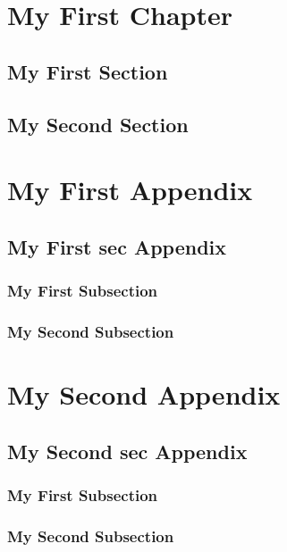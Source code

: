 \documentclass{book}
\begin{document}
\tableofcontents

\chapter{\large My First Chapter}
\localtableofcontents
\section{  My First Section}
\section{My Second Section}

\begin{appendices}
\chapter{My First Appendix}
\section{My First sec Appendix}
\localtableofcontents
\subsection{My First Subsection}
\subsection{My Second Subsection}
\chapter{My Second Appendix}
\section{My Second sec Appendix}
\localtableofcontents
\subsection{My First Subsection}
\subsection{My Second Subsection}
\end{appendices}
\end{document}
